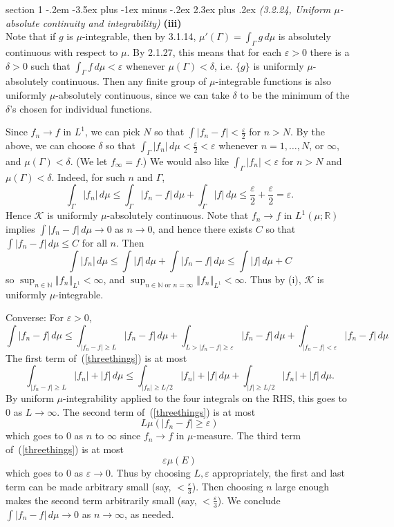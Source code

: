 \documentclass[12pt]{article}
\makeatletter
\theoremstyle{norm}
\newcommand{\N}[0]{\mathbb{N}}
\newcommand{\R}[0]{\mathbb{R}}
\providecommand{\cal}[1]{\mathcal{#1}}
\renewcommand{\cal}[1]{\mathcal{#1}}
\newcommand{\Ga}[0]{\Gamma}
\newcommand{\de}[0]{\delta}
\newcommand{\ep}[0]{\varepsilon}
\newcommand{\eph}[0]{\frac{\varepsilon}{2}}
\newcommand{\ept}[0]{\frac{\varepsilon}{3}}
\newcommand{\subprob}[1]{\noindent\textbf{#1}\\}
\newcommand{\iy}[0]{\infty}
\newcommand{\nl}[1]{\left \Vert #1\right \Vert_{L^1}}
\newenvironment{problem}{\@startsection
       {section}
       {1}
       {-.2em}
       {-3.5ex plus -1ex minus -.2ex}
       {2.3ex plus .2ex}
       {\pagebreak[3]%
       \large\bf\noindent{Problem }
       }
       }
       {%
       }
\makeatother
\begin{document}
\begin{problem}{\it(3.2.24, Uniform $\mu$-absolute continuity and integrability)}
\subprob{(iii)}
Note that if $g$ is $\mu$-integrable, then by 3.1.14, $\mu'(\Ga)=\int_{\Ga} g\,d\mu$ is absolutely continuous with respect to $\mu$. By 2.1.27, this means that for each $\ep>0$ there is a $\de>0$ such that $\int_{\Ga}f\,d\mu<\ep$ whenever $\mu(\Ga)<\de$, i.e. $\{g\}$ is uniformly $\mu$-absolutely continuous. Then any finite group of $\mu$-integrable functions is also uniformly $\mu$-absolutely continuous, since we can take $\de$ to be the minimum of the $\de$'s chosen for individual functions.

Since $f_n\to f$ in $L^1$, we can pick $N$ so that $\int|f_n-f|<\eph$ for $n>N$. By the above, we can choose $\de$ so that $\int_{\Ga}|f_n|\,d\mu<\eph<\ep$ whenever $n=1,\ldots, N$, or $\infty$, and $\mu(\Ga)<\de$. (We let $f_{\iy}=f$.) 
We would also like $\int_{\Ga}|f_n|<\ep$ for $n>N$ and $\mu(\Ga)<\de$. Indeed, for such $n$ and $\Ga$,
\[
\int_{\Ga}|f_n|\,d\mu\le \int_{\Ga}|f_n-f|\,d\mu+\int_{\Ga}|f|\,d\mu
\le \eph+\eph=\ep.
\]
Hence $\cal K$ is uniformly $\mu$-absolutely continuous. Note that $f_n\to f$ in $L^1(\mu;\R)$ implies $\int |f_n-f|\,d\mu\to 0$ as $n\to 0$, and hence there exists $C$ so that $\int |f_n-f|\,d\mu\le C$ for all $n$. 
Then
\[
\int|f_n|\,d\mu\le \int |f|\,d\mu+\int |f_n-f|\,d\mu
\le \int |f|\,d\mu+C
\]
so $\sup_{n\in \N}\nl{f_n}<\iy$, and $\sup_{n\in \N\text{ or }n=\iy} \nl{f_n}<\iy$. Thus by (i), $\cal K$ is uniformly $\mu$-integrable.

Converse: %
For $\ep>0$,
\begin{equation}\label{threethings}
\int|f_n-f|\,d\mu\le \int_{|f_n-f|\ge L} |f_n-f|\,d\mu
+\int_{L>|f_n-f|\ge\ep}|f_n-f|\,d\mu
+\int_{|f_n-f|<\ep}|f_n-f|\,d\mu
\end{equation}
The first term of~(\ref{threethings}) is at most
\[
\int_{|f_n-f|\ge L}|f_n|+|f|\,d\mu
\le \int_{|f_n|\ge L/2}|f_n|+|f|\,d\mu
+\int_{|f|\ge L/2}|f_n|+|f|\,d\mu.
\]
By uniform $\mu$-integrability applied to the four integrals on the RHS, this goes to 0 as $L\to \iy$. 
The second term of~(\ref{threethings}) is at most
\[
L\mu(|f_n-f|\ge \ep)
\]
which goes to 0 as $n$ to $\iy$ since $f_n\to f$ in $\mu$-measure.
The third term of~(\ref{threethings}) is at most
\[
\ep\mu(E)
\]
which goes to 0 as $\ep\to 0$. Thus by choosing $L,\ep$ appropriately, the first and last term can be made arbitrary small (say, $<\ept$). Then choosing $n$ large enough makes the second term arbitrarily small (say, $<\ept$). We conclude $\int |f_n-f|\,d\mu\to 0$ as $n\to \iy$, as needed.\\


\end{problem}
\end{document}
